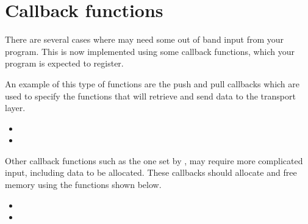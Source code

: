 \section{Callback functions}

There are several cases where \gnutls{} may need some out of band input from
your program. This is now implemented using some callback functions,
which your program is expected to register.

An example of this type of functions are the push and pull callbacks
which are used to specify the functions that will retrieve and send
data to the transport layer.
\begin{itemize}
\item {}
\item {}
\end{itemize}

Other callback functions such as the one set by
,
may require more complicated input, including data to be allocated.
These callbacks should allocate and free memory using the functions shown below.
\begin{itemize}
\item {}
\item {}
\end{itemize}
